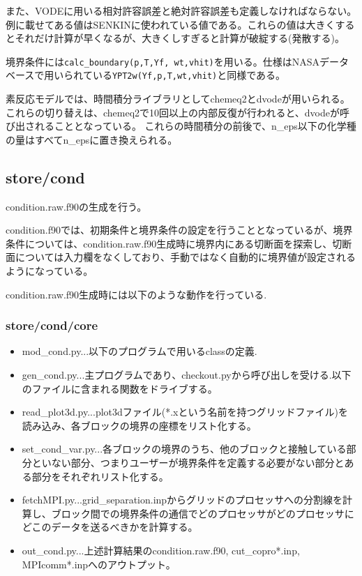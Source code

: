 \documentclass{jsarticle}
\begin{document}
また、VODEに用いる相対許容誤差と絶対許容誤差も定義しなければならない。例に載せてある値はSENKINに使われている値である。これらの値は大きくするとそれだけ計算が早くなるが、大きくしすぎると計算が破綻する(発散する)。

境界条件には\verb|calc_boundary(p,T,Yf, wt,vhit)|を用いる。仕様はNASAデータベースで用いられている\verb|YPT2w(Yf,p,T,wt,vhit)|と同様である。

素反応モデルでは、時間積分ライブラリとしてchemeq2とdvodeが用いられる。
これらの切り替えは、chemeq2で10回以上の内部反復が行われると、dvodeが呼び出されることとなっている。
これらの時間積分の前後で、n\_eps以下の化学種の量はすべてn\_epsに置き換えられる。
\subsection{store/cond}%
condition.raw.f90の生成を行う。

condition.f90では、初期条件と境界条件の設定を行うこととなっているが、境界条件については、condition.raw.f90生成時に境界内にある切断面を探索し、切断面については入力欄をなくしており、手動ではなく自動的に境界値が設定されるようになっている。

condition.raw.f90生成時には以下のような動作を行っている.
\subsubsection{store/cond/core}
\begin{itemize}
\item mod\_cond.py...以下のプログラムで用いるclassの定義.
\item gen\_cond.py...主プログラムであり、checkout.pyから呼び出しを受ける.以下のファイルに含まれる関数をドライブする。
\item read\_plot3d.py...plot3dファイル(*.xという名前を持つグリッドファイル)を読み込み、各ブロックの境界の座標をリスト化する。
\item set\_cond\_var.py...各ブロックの境界のうち、他のブロックと接触している部分といない部分、つまりユーザーが境界条件を定義する必要がない部分とある部分をそれぞれリスト化する。
\item fetchMPI.py...grid\_separation.inpからグリッドのプロセッサへの分割線を計算し、ブロック間での境界条件の通信でどのプロセッサがどのプロセッサにどこのデータを送るべきかを計算する。
\item out\_cond.py...上述計算結果のcondition.raw.f90, cut\_copro*.inp, MPIcomm*.inpへのアウトプット。
\end{itemize}
\end{document}
